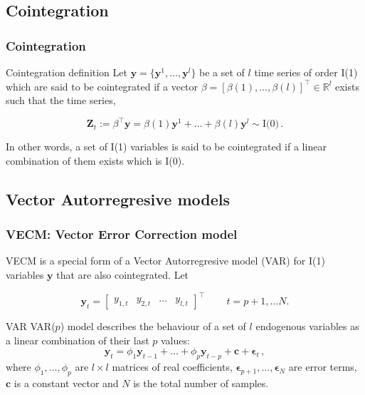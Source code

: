 \documentclass[compress,red]{beamer}
\begin{document}
\subsection{Cointegration}
\begin{frame}
\frametitle{Cointegration}
\begin{block}{Cointegration definition}
Let $\mathbf{y} = \{\mathbf{y}^1, \dots, \mathbf{y}^l\}$ be a set of $l$
time series of order I(1) which are said to be cointegrated if a vector
$\beta=[\beta(1),\dots,\beta(l)]^\top \in \mathbb{R}^l$  exists such that the
time series,

\begin{equation*}
 \mathbf{Z}_t:= \beta^\top \mathbf{y} = \beta(1) \mathbf{y}^1 + \dots + \beta(l) \mathbf{y}^l \sim
 \text{I(0)}\, .
\end{equation*}
\end{block}
In other words, a set of I(1) variables is said to be cointegrated if
a linear combination of them exists which is I(0).

\end{frame}

\subsection{Vector Autorregresive models}
\begin{frame}
\frametitle{VECM: Vector Error Correction model}

VECM is a special form of a Vector Autorregresive model (VAR) for I(1)
variables $\mathbf{y}$ that are also cointegrated. Let 

\begin{equation*}
\label{eq:variables}
\mathbf{y}_t = 
\begin{bmatrix} y_{1,t} & y_{2,t} & \dots & y_{l,t}
\end{bmatrix}^\top \, \qquad t=p+1, \dots N. 
\end{equation*}

\begin{block}{VAR}
VAR($p$) model describes the behaviour of a set of $l$
endogenous variables as a linear combination of their last $p$ values:
{\color{blue}
\begin{equation*}
\label{eq:var}
 \mathbf{y}_t = \phi_1 \mathbf{y}_{t-1}  + \dots +   \phi_p\mathbf{y}_{t-p}
+ \mathbf{c} + \mathbf{\epsilon}_t \, ,
\end{equation*}}
\noindent where  ${\phi_1,\dots,\phi_p}$ are $l \times l$
matrices of real coefficients,
$\mathbf{\epsilon}_{p+1},\dots,\mathbf{\epsilon}_N$ are error terms,
$\mathbf{c}$ is a constant vector and $N$ is the total number of samples.
\end{block}
\end{frame}
\end{document}
